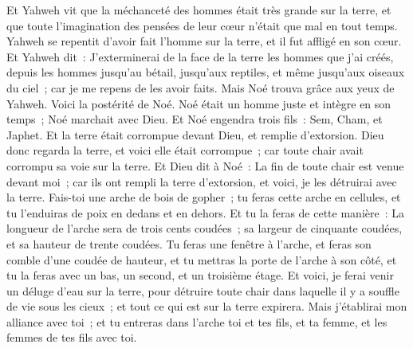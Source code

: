\begin{multicols}{2}
Et Yahweh vit que la méchanceté des hommes était très grande sur la terre, et que toute l'imagination des pensées de leur cœur n'était que mal en tout temps.
Yahweh se repentit d'avoir fait l'homme sur la terre, et il fut affligé en son cœur.
Et Yahweh dit~: J'exterminerai de la face de la terre les hommes que j'ai créés, depuis les hommes jusqu'au bétail, jusqu'aux reptiles, et même jusqu'aux oiseaux du ciel~; car je me repens de les avoir faits.
Mais Noé trouva grâce aux yeux de Yahweh.
Voici la postérité de Noé. Noé était un homme juste et intègre en son temps~; Noé marchait avec Dieu.
Et Noé engendra trois fils~: Sem, Cham, et Japhet.
Et la terre était corrompue devant Dieu, et remplie d'extorsion.
Dieu donc regarda la terre, et voici elle était corrompue~; car toute chair avait corrompu sa voie sur la terre.
Et Dieu dit à Noé~: La fin de toute chair est venue devant moi~; car ils ont rempli la terre d'extorsion, et voici, je les détruirai avec la terre.
Fais-toi une arche de bois de gopher~; tu feras cette arche en cellules, et tu l'enduiras de poix en dedans et en dehors.
Et tu la feras de cette manière~: La longueur de l'arche sera de trois cents coudées~; sa largeur de cinquante coudées, et sa hauteur de trente coudées.
Tu feras une fenêtre à l'arche, et feras son comble d'une coudée de hauteur, et tu mettras la porte de l'arche à son côté, et tu la feras avec un bas, un second, et un troisième étage.
Et voici, je ferai venir un déluge d'eau sur la terre, pour détruire toute chair dans laquelle il y a souffle de vie sous les cieux~; et tout ce qui est sur la terre expirera.
Mais j'établirai mon alliance avec toi~; et tu entreras dans l'arche toi et tes fils, et ta femme, et les femmes de tes fils avec toi.

\end{multicols}
